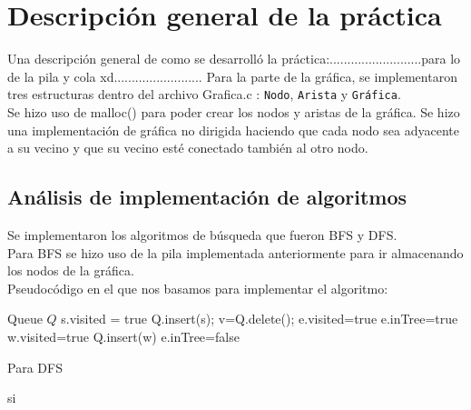 \documentclass{article}
\begin{document}
    \clearpage
    \pagestyle{fancy}
    \renewcommand{\headrulewidth}{0.4pt}
    \renewcommand{\footrulewidth}{0.4pt}
    \cfoot{\thepage}
    \section{Descripción general de la práctica}
    Una descripción general de como se desarrolló la práctica:..........................para lo de la pila y cola xd.........................
    Para la parte de la gráfica, se implementaron tres estructuras dentro del archivo Grafica.c : \texttt{Nodo}, \texttt{Arista} y \texttt{Gráfica}.\\
    Se hizo uso de malloc() para poder crear los nodos y aristas de la gráfica. Se hizo una implementación de gráfica no dirigida 
    haciendo que cada nodo sea adyacente a su vecino y que su vecino esté conectado también al otro nodo.
    \subsection{Análisis de implementación de algoritmos}
    Se implementaron los algoritmos de búsqueda que fueron BFS y DFS.\\
    Para BFS se hizo uso de la pila implementada anteriormente para ir almacenando los nodos de la gráfica.\\
    Pseudocódigo en el que nos basamos para implementar el algoritmo:
    \begin{algorithm}[H]
        \caption{BFS}\label{alg:cap}
        \begin{algorithmic}
            \State Queue $Q$
            \State s.visited = true
            \State Q.insert(s);
                \State v=Q.delete();
                        \State e.visited=true
                            \State e.inTree=true
                            \State w.visited=true
                            \State Q.insert(w)
                        \Else
                            \State e.inTree=false
                        \EndIf
                    \EndIf
                \EndFor
            \EndWhile
        \end{algorithmic}
    \end{algorithm}
    Para DFS 
    \begin{algorithm}[H]
        \caption{DFS}\label{alg:cap}
        \begin{algorithmic}
            \State si
        \end{algorithmic}
    \end{algorithm}
\end{document}
